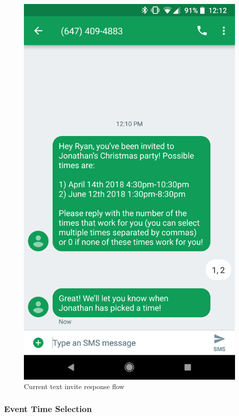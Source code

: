 \documentclass{sigchi}
\begin{document}
\begin{figure}
  \centering
  \includegraphics[width=1.3\columnwidth]{Mockup/TextResponse}
  \caption{Current text invite response flow}
\end{figure}
\FloatBarrier

\subsubsection{Event Time Selection}
\end{document}
